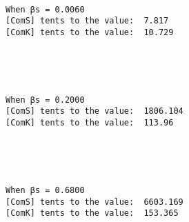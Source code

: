 \documentclass[11pt]{article}
\begin{document}
    \begin{center}
    \end{center}
    { \hspace*{\fill} \\}
    
    \begin{Verbatim}[commandchars=\\\{\}]
When βs = 0.0060
[ComS] tents to the value:  7.817
[ComK] tents to the value:  10.729

    \end{Verbatim}

    \begin{center}
    \end{center}
    { \hspace*{\fill} \\}
    
    \begin{center}
    \end{center}
    { \hspace*{\fill} \\}
    
    \begin{Verbatim}[commandchars=\\\{\}]
When βs = 0.2000
[ComS] tents to the value:  1806.104
[ComK] tents to the value:  113.96

    \end{Verbatim}

    \begin{center}
    \end{center}
    { \hspace*{\fill} \\}
    
    \begin{center}
    \end{center}
    { \hspace*{\fill} \\}
    
    \begin{Verbatim}[commandchars=\\\{\}]
When βs = 0.6800
[ComS] tents to the value:  6603.169
[ComK] tents to the value:  153.365

    \end{Verbatim}
\end{document}
